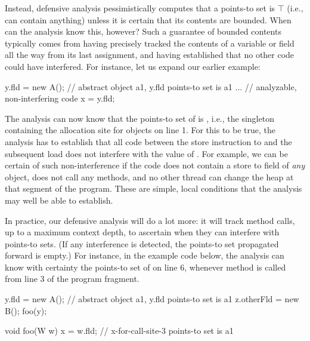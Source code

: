 Instead, defensive analysis pessimistically computes that a points-to
set is $\top$ (i.e., can contain anything) unless it is certain that
its contents are bounded. When can the analysis know this, however?
Such a guarantee of bounded contents typically comes from having
precisely tracked the contents of a variable or field all the way from
its last assignment, and having established that no other code could
have interfered.  For instance, let us expand our earlier example:

\vspace{-3mm}\begin{minipage}[l]{5.1in}
\begin{javacode}
y.fld = new A(); // abstract object a1, y.fld points-to set is {a1}
... // analyzable, non-interfering code
x = y.fld;
\end{javacode}
\end{minipage}

The analysis can now know that the points-to set of  is
, i.e., the singleton containing the allocation site for
 objects on line 1. For this to be true, the analysis has to
establish that all code between the store instruction to 
and the subsequent load does not interfere with the value of
. For example, we can be certain of such non-interference if
the code does not contain a store to field  of \emph{any}
object, does not call any methods, and no other thread can change the
heap at that segment of the program.%
These are simple, local conditions that the analysis may well be able to
establish.

In practice, our defensive analysis will do a lot more: it will track
method calls, up to a maximum context depth, to ascertain when they
can interfere with points-to sets. (If any interference is detected,
the points-to set propagated forward is empty.) For instance, in
the example code below, the analysis can know with certainty the
points-to set of  on line 6, whenever method  is
called from line 3 of the program fragment.

\vspace{-3mm}\begin{minipage}[l]{5.1in}
\begin{javacode}
y.fld = new A(); // abstract object a1, y.fld points-to set is {a1}
z.otherFld = new B();
foo(y);

void foo(W w) {
  x = w.fld;  // x-for-call-site-3 points-to set is {a1}
}
\end{javacode}
\end{minipage}

